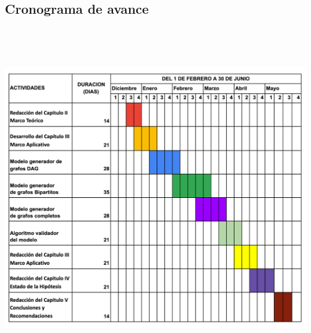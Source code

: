 \documentclass[11pt]{extarticle}
\begin{document}
\subsection{Cronograma de avance}
\includegraphics[width=18cm,height=15cm]{calendario.png}
\end{document}
